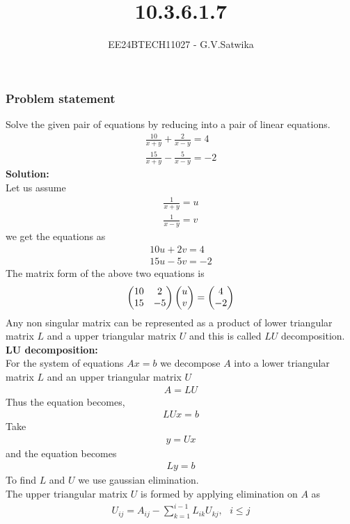 \documentclass{beamer}
\begin{document}
\title{10.3.6.1.7}
\author{EE24BTECH11027 - G.V.Satwika}
\date{}
\frame{\titlepage}

\begin{frame}
\frametitle{Problem statement}
Solve the given pair of equations by reducing into a pair of linear equations.
\begin{align}
    \frac{10}{x+y}+\frac{2}{x-y}=4 \label{firsteq}\\
    \frac{15}{x+y}-\frac{5}{x-y}=-2\label{secondeq}
\end{align}
\textbf{Solution:}\\
Let  us assume 
\begin{align}
    \frac{1}{x+y}=u\label{first assumption}\\
    \frac{1}{x-y}=v\label{second assumption}
\end{align}
we get the equations as
\begin{align}
    10u+2v=4\\
    15u-5v=-2
\end{align}
The matrix form of the above two equations is
\begin{align}
    \begin{pmatrix}10 & 2 \\15 & -5\end{pmatrix}
\begin{pmatrix}u\\v\end{pmatrix}=\begin{pmatrix}4 \\ -2\end{pmatrix}
\end{align}
Any non singular matrix can be represented as a product of lower triangular matrix $L$ and a upper triangular matrix $U$ and this is called $LU$ decomposition.\\
\textbf{LU decomposition:}\\
For the system of equations $Ax=b$ we decompose $A$ into a lower triangular matrix $L$ and an upper triangular matrix $U$
\begin{align}
    A=LU
\end{align}
Thus the equation becomes,
\begin{align}
    LUx=b
\end{align}
Take 
\begin{align}
    y=Ux
\end{align}
and the equation becomes
\begin{align}
    Ly=b
\end{align}
To find $L$ and $U$ we use gaussian elimination.\\The upper triangular matrix $U$ is formed by applying elimination on $A$ as
\begin{align}
    U_{ij}=A_{ij}-\sum_{k=1}^{i-1}L_{ik}U_{kj}, \text{ } i\le j

\end{align}
\end{frame}
\end{document}
